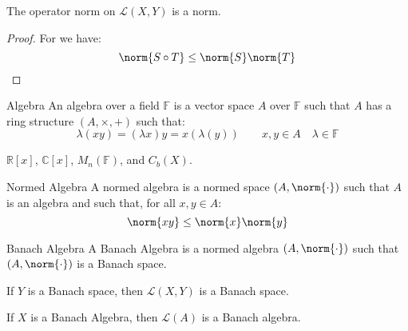 \documentclass[crop=false,class=book,oneside]{standalone}
\begin{document}
        \begin{theorem}
            The operator norm on $\mathscr{L}(X,Y)$ is a norm.
        \end{theorem}
        \begin{proof}
            For we have:
            \begin{equation}
                \norm{S\circ{T}}\leq\norm{S}\norm{T}
            \end{equation}
        \end{proof}
        \begin{ldefinition}{Algebra}
            An algebra over a field $\mathbb{F}$ is a vector
            space $A$ over $\mathbb{F}$ such that $A$ has a ring
            structure $(A,\times,+)$ such that:
            \begin{equation}
                \lambda(xy)=(\lambda{x})y
                =x(\lambda(y))
                \quad\quad
                x,y\in{A}
                \quad\lambda\in\mathbb{F}
            \end{equation}
        \end{ldefinition}
        \begin{lexample}
            $\mathbb{R}[x]$, $\mathbb{C}[x]$, $M_{n}(\mathbb{F})$,
            and $C_{b}(X)$.
        \end{lexample}
        \begin{ldefinition}{Normed Algebra}
            A normed algebra is a normed space $(A,\norm{\cdot})$
            such that $A$ is an algebra and such that,
            for all $x,y\in{A}$:
            \begin{equation}
                \norm{xy}\leq\norm{x}\norm{y}
            \end{equation}
        \end{ldefinition}
        \begin{ldefinition}{Banach Algebra}
            A Banach Algebra is a normed algebra $(A,\norm{\cdot})$
            such that $(A,\norm{\cdot})$ is a Banach space.
        \end{ldefinition}
        \begin{theorem}
            If $Y$ is a Banach space, then $\mathscr{L}(X,Y)$
            is a Banach space.
        \end{theorem}
        \begin{theorem}
            If $X$ is a Banach Algebra, then
            $\mathscr{L}(A)$ is a Banach algebra.
        \end{theorem}
\end{document}
